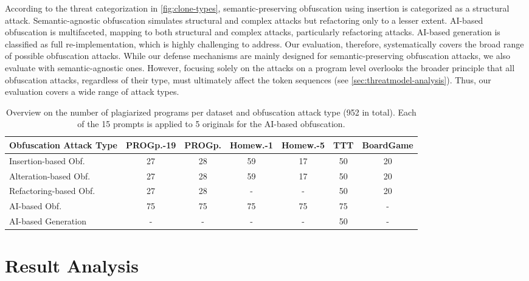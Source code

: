 %
According to the threat categorization in \autoref{fig:clone-types}, semantic-preserving obfuscation using insertion is categorized as a structural attack. Semantic-agnostic obfuscation simulates structural and complex attacks but refactoring only to a lesser extent. AI-based obfuscation is multifaceted, mapping to both structural and complex attacks, particularly refactoring attacks. AI-based generation is classified as full re-implementation, which is highly challenging to address. Our evaluation, therefore, systematically covers the broad range of possible obfuscation attacks. While our defense mechanisms are mainly designed for semantic-preserving obfuscation attacks, we also evaluate with semantic-agnostic ones.
%
However, focusing solely on the attacks on a program level overlooks the broader principle that all obfuscation attacks, regardless of their type, must ultimately affect the token sequences (see \autoref{sec:threatmodel-analysis}). Thus, our evaluation covers a wide range of attack types.
%
\begin{table}[b]
	\centering
    \small
    \setlength{\tabcolsep}{5pt}
	\begin{tabular}{lcccccc}
		\toprule
		Obfuscation Attack Type  & PROGp.-19 & PROGp. & Homew.-1 & Homew.-5 & TTT & BoardGame\\
		\midrule
		Insertion-based Obf. & 27    & 28    & 59   & 17   & 50 & 20 \\
		Alteration-based Obf.   & 27    & 28    & 59   & 17   & 50 & 20 \\
        Refactoring-based Obf.   & 27    & 28    & -   & -  & 50 & 20 \\
		AI-based Obf. & 75    & 75    & 75   & 75   & 75 & - \\
		AI-based Generation      & -     & -     & -    & -    & 50 & -\\
		\bottomrule
	\end{tabular}
    \caption[Obfuscation Attacks]{Overview on the number of plagiarized programs per dataset and obfuscation attack type (952 in total). Each of the 15 prompts is applied to 5 originals for the AI-based obfuscation.}
    \label{tab:plagiate}
\end{table}

\section{Result Analysis}

